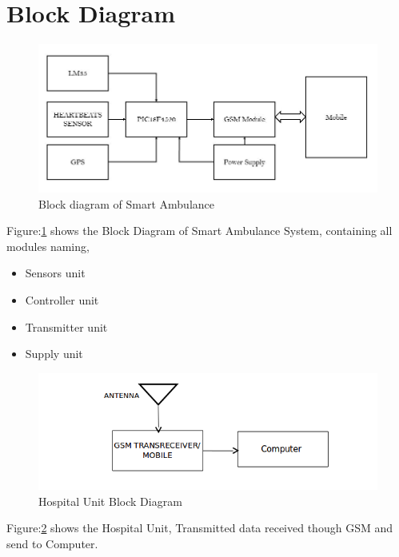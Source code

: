\documentclass[12pt,a4paper,oneside,openright]{report}
\begin{document}
\section{Block Diagram}

\begin{figure}[!h]
 \centering
 \includegraphics[width = .89\textwidth]{Figures/fig_2.png}
 \caption{Block diagram of Smart Ambulance}
 \label{bd}
\end{figure}

Figure:\ref{bd} shows the Block Diagram of Smart Ambulance System, containing all modules naming,
\begin{itemize}
 \item Sensors unit
 \item Controller unit
 \item Transmitter unit
 \item Supply unit
\end{itemize}

\begin{figure}[!h]
 \centering
 \includegraphics[width = .70\textwidth]{Figures/fig_3.png}
 \caption{Hospital Unit Block Diagram}
 \label{hbd}
\end{figure}
Figure:\ref{hbd} shows the Hospital Unit, Transmitted data received though GSM and send to Computer.

\end{document}
